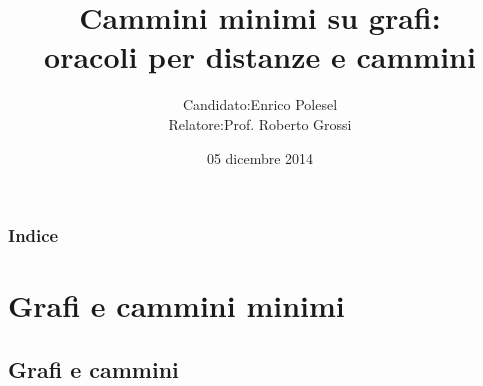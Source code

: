 \documentclass{beamer}
\theoremstyle{plain}
\theoremstyle{definition}
\theoremstyle{remark}
\begin{document}
\title[Oracoli per cammini e distanze]{Cammini minimi su grafi:\\
  oracoli per distanze e cammini}
\date{05 dicembre 2014}

\author[Enrico Polesel]{\begin{tabular}{r@{ }l}
Candidato: &  Enrico Polesel \\ 
Relatore: & Prof. Roberto Grossi
\end{tabular}
}



\begin{frame}[plain]
  \titlepage
\end{frame}

\begin{frame}[plain]
 \frametitle{Indice}
 \tableofcontents
\end{frame}




\AtBeginSubsection[]
{
  \begin{frame}[plain]{\secname $\rightarrow$ \subsecname}
    \tableofcontents[currentsubsection]
  \end{frame}
}


\section{Grafi e cammini minimi}

\subsection{Grafi e cammini}
\end{document}

